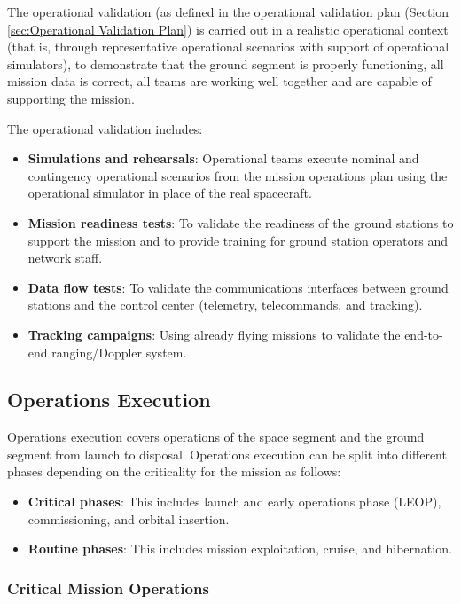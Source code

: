 The operational validation (as defined in the operational validation plan (Section \ref{sec:Operational Validation Plan}) is carried out in a realistic operational context (that is, through representative operational scenarios with support of operational simulators), to demonstrate that the ground segment is properly functioning, all mission data is correct, all teams are working well together and are capable of supporting the mission.

The operational validation includes:

\begin{itemize}
\item \textbf{Simulations and rehearsals}: Operational teams execute nominal and contingency operational scenarios from the mission operations plan using the operational simulator in place of the real spacecraft.
\item \textbf{Mission readiness tests}: To validate the readiness of the ground stations to support the mission and to provide training for ground station operators and network staff.
\item \textbf{Data flow tests}: To validate the communications interfaces between ground stations and the control center (telemetry, telecommands, and tracking).
\item \textbf{Tracking campaigns}: Using already flying missions to validate the end-to-end ranging/Doppler system.
\end{itemize}

\subsection{Operations Execution}

Operations execution covers operations of the space segment and the ground segment from launch to disposal. Operations execution can be split into different phases depending on the criticality for the mission as follows:

\begin{itemize}
\item \textbf{Critical phases}: This includes launch and early operations phase (LEOP), commissioning, and orbital insertion.
\item \textbf{Routine phases}: This includes mission exploitation, cruise, and hibernation.
\end{itemize}

\subsubsection{Critical Mission Operations}

